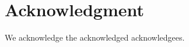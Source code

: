 \documentclass[journal]{IEEEtran}
\begin{document}
%
%
%







\section*{Acknowledgment}
We acknowledge the acknowledged acknowledgees.



\end{document}
